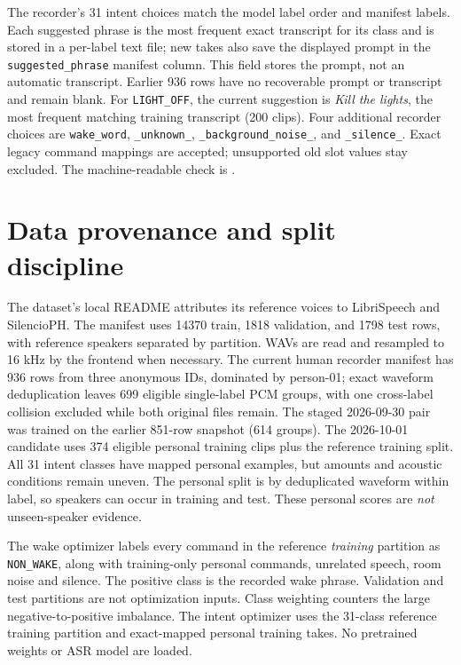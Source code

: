 \documentclass[11pt,a4paper]{article}
\begin{document}
The recorder's 31 intent choices match the model label order and manifest labels. Each suggested phrase is the most frequent exact transcript for its class and is stored in a per-label text file; new takes also save the displayed prompt in the \texttt{suggested\_phrase} manifest column. This field stores the prompt, not an automatic transcript. Earlier 936 rows have no recoverable prompt or transcript and remain blank. For \texttt{LIGHT\_OFF}, the current suggestion is \emph{Kill the lights}, the most frequent matching training transcript (200 clips). Four additional recorder choices are \texttt{wake\_word}, \texttt{\_unknown\_}, \texttt{\_background\_noise\_}, and \texttt{\_silence\_}. Exact legacy command mappings are accepted; unsupported old slot values stay excluded. The machine-readable check is .

\section{Data provenance and split discipline}
The dataset's local README attributes its reference voices to LibriSpeech and SilencioPH. The manifest uses 14370 train, 1818 validation, and 1798 test rows, with reference speakers separated by partition. WAVs are read and resampled to 16 kHz by the frontend when necessary. The current human recorder manifest has 936 rows from three anonymous IDs, dominated by person-01; exact waveform deduplication leaves 699 eligible single-label PCM groups, with one cross-label collision excluded while both original files remain. The staged 2026-09-30 pair was trained on the earlier 851-row snapshot (614 groups). The 2026-10-01 candidate uses 374 eligible personal training clips plus the reference training split. All 31 intent classes have mapped personal examples, but amounts and acoustic conditions remain uneven. The personal split is by deduplicated waveform within label, so speakers can occur in training and test. These personal scores are \emph{not} unseen-speaker evidence.

The wake optimizer labels every command in the reference \emph{training} partition as \texttt{NON\_WAKE}, along with training-only personal commands, unrelated speech, room noise and silence. The positive class is the recorded wake phrase. Validation and test partitions are not optimization inputs. Class weighting counters the large negative-to-positive imbalance. The intent optimizer uses the 31-class reference training partition and exact-mapped personal training takes. No pretrained weights or ASR model are loaded.
\end{document}
